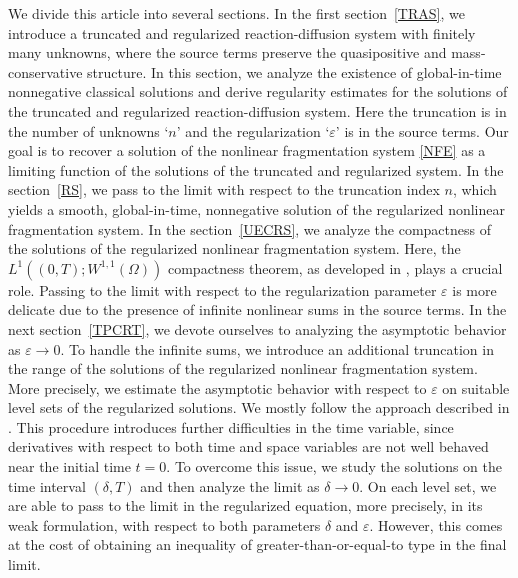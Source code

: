 \documentclass[a4paper,12pt,reqno]{amsart}
\theoremstyle{plain}
\numberwithin{equation}{section}
\begin{document}
	We divide this article into several sections. In the first section~\ref{TRAS}, we
	introduce a truncated and regularized reaction-diffusion system with finitely many
	unknowns, where the source terms preserve the quasipositive and mass-conservative
	structure. In this section, we analyze the existence of global-in-time nonnegative
	classical solutions and derive regularity estimates for the solutions of the truncated
	and regularized reaction-diffusion system. Here the truncation is in the number of unknowns `$n$' and the regularization `$\varepsilon$' is in the source terms.
	\newline
	Our goal is to recover a solution of the nonlinear fragmentation system \eqref{NFE} 
	as a limiting function of the solutions of the truncated and regularized system. In 
	the section~\ref{RS}, we pass to the limit with respect to the truncation 
	index $n$, which yields a smooth, global-in-time, nonnegative solution of the 
	regularized nonlinear fragmentation system.
	\newline
	In the section~\ref{UECRS}, we analyze the compactness of the solutions of the
	regularized nonlinear fragmentation system. Here, the $L^1((0,T); W^{1,1}(\Omega))$
	compactness theorem, as developed in \cite{Pierre2010}, plays a crucial role.
	\newline
	Passing to the limit with respect to the regularization parameter $\varepsilon$ is more
	delicate due to the presence of infinite nonlinear sums in the source terms. In the
	next section~\ref{TPCRT}, we devote ourselves to analyzing the asymptotic behavior as
	$\varepsilon \to 0$. To handle the infinite sums, we introduce an additional truncation
	in the range of the solutions of the regularized nonlinear fragmentation system. More
	precisely, we estimate the asymptotic behavior with respect to $\varepsilon$ on suitable
	level sets of the regularized solutions. We mostly follow the approach described in \cite{Pierre2010}.
	\newline
	This procedure introduces further difficulties in the time variable, since derivatives
	with respect to both time and space variables are not well behaved near the initial time $t = 0$.
	To overcome this issue, we study the solutions on the time interval $(\delta, T)$ and
	then analyze the limit as $\delta \to 0$. On each level set, we are able to pass to the
	limit in the regularized equation, more precisely, in its weak formulation, with respect to both
	parameters $\delta$ and $\varepsilon$. However, this comes at the cost of obtaining an
	inequality of greater-than-or-equal-to type in the final limit.   
\end{document}
